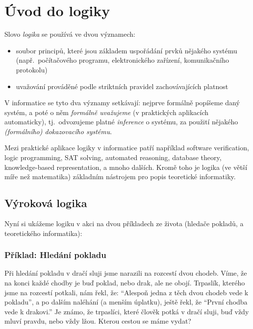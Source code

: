 \chapter{Úvod do logiky}



Slovo \emph{logika} se používá ve dvou významech:
\begin{itemize}
    \item soubor principů, které jsou základem uspořádání prvků nějakého systému (např.\ počítačového programu, elektronického zařízení, komunikačního protokolu)
    \item uvažování prováděné podle striktních pravidel zachovávajících platnost
\end{itemize}
V informatice se tyto dva významy setkávají: nejprve formálně popíšeme daný systém, a poté o něm \emph{formálně uvažujeme} (v praktických aplikacích automaticky), tj.\ odvozujeme platné \emph{inference} o systému, za použití nějakého \emph{(formálního) dokazovacího systému}.

Mezi praktické aplikace logiky v informatice patří například software verification, logic programming, SAT solving, automated reasoning, database theory, knowledge-based representation, a mnoho dalších. Kromě toho je logika (ve větší míře než matematika) základním nástrojem pro popis teoretické informatiky.



\section{Výroková logika}


Nyní si ukážeme logiku v akci na dvou příkladech ze života (hledače pokladů, a teoretického informatika):


\subsection{Příklad: Hledání pokladu}

\begin{tcolorbox}
\begin{example}
Při hledání pokladu v dračí sluji jsme narazili na rozcestí dvou chodeb. Víme, že na konci každé chodby je buď poklad, nebo drak, ale ne obojí. Trpaslík, kterého jsme na rozcestí potkali, nám řekl, že: ``Alespoň jedna z těch dvou chodeb vede k pokladu'', a po dalším naléhání (a menším úplatku), ještě řekl, že ``První chodba vede k drakovi.'' Je známo, že trpaslíci, které člověk potká v dračí sluji, buď vždy mluví pravdu, nebo vždy lžou. Kterou cestou se máme vydat?
\end{example}
\end{tcolorbox}


